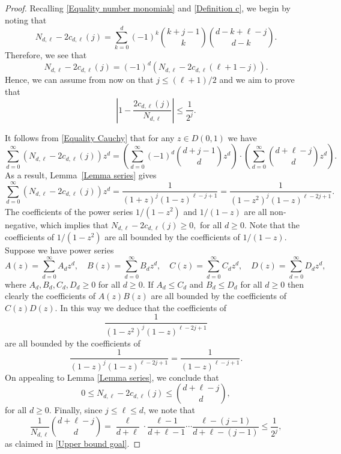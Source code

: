 \documentclass[11pt, reqno]{amsart}
\numberwithin{equation}{section}
\renewcommand{\leq}{\leqslant}
\renewcommand{\geq}{\geqslant}
\begin{document}
\begin{proof}
Recalling \eqref{Equality number monomials}
and \eqref{Definition c}, 
we begin by noting that
\begin{equation}
\label{Equality Cauchy}
N_{d,\ell} - 2 c_{d,\ell}(j) = \sum_{k=0}^d (-1)^k \binom{k+j-1}{k} \binom{d-k+\ell-j}{d-k}.
\end{equation}
Therefore, we see that
\begin{equation*}
N_{d,\ell} - 2 c_{d,\ell}(j) = (-1)^d \left( N_{d,\ell} - 2 c_{d,\ell}(\ell+1-j) \right).
\end{equation*}
Hence, we can assume from now on that $j \leq  (\ell+1)/2$ and we aim to prove that 
\begin{equation}
\label{Upper bound goal}
\left| 1-\frac{2c_{d,\ell}(j)}{N_{d,\ell}} \right| \leq 
 \frac{1}{2^j}.
\end{equation}

It follows from  \eqref{Equality Cauchy} that for any $z \in D(0,1)$ we have
\begin{equation*}
\sum_{d=0}^{\infty} \left( N_{d,\ell} - 2 c_{d,\ell}(j) \right) z^d = \left( \sum_{d=0}^{\infty} (-1)^d \binom{d+j-1}{d} z^d \right) \cdot \left( \sum_{d=0}^{\infty} \binom{d+\ell-j}{d} z^d \right).
\end{equation*}
As a result, Lemma~\ref{Lemma series} gives
\begin{equation*}
\sum_{d=0}^{\infty} \left( N_{d,\ell} - 2 c_{d,\ell}(j) \right) z^d = \frac1{(1+z)^j (1-z)^{\ell-j+1}}
= \frac1{(1-z^2)^j (1-z)^{\ell-2j+1}}.
\end{equation*}
The coefficients of the power series $1/(1-z^2)$ and $1/(1-z)$ are all non-negative, which implies that 
$
N_{d,\ell} - 2 c_{d,\ell}(j) \geq 0,
$ 
for all $d\geq 0$. Note that the coefficients of $1/(1-z^2)$ are all bounded by the coefficients of $1/(1-z)$.
Suppose we have power series
$$
A(z)=\sum_{d=0}^\infty A_d z^d, \quad 
B(z)=\sum_{d=0}^\infty B_d z^d, \quad
C(z)=\sum_{d=0}^\infty C_d z^d, \quad 
D(z)=\sum_{d=0}^\infty D_d z^d,
$$
where $A_d,B_d,C_d,D_d\geq 0$ for all $d\geq 0$.  If $A_d\leq C_d$ and $B_d\leq D_d$ for all $d\geq 0$ then clearly the coefficients of $A(z)B(z)$ are all bounded by the coefficients of $C(z)D(z)$. In this way we deduce that the coefficients of 
$$
 \frac1{(1-z^2)^j (1-z)^{\ell-2j+1}}
$$
are all bounded by the coefficients of 
$$
 \frac1{(1-z)^j (1-z)^{\ell-2j+1}}=
  \frac1{(1-z)^{\ell-j+1}}.
$$
On appealing to Lemma \ref{Lemma series}, we conclude  that 
$$
0\leq N_{d,\ell} - 2 c_{d,\ell}(j)\leq 
\binom{d+\ell-j}{d},
$$
for all $d\geq 0$.
Finally, since $j\leq \ell\leq d$, we note that 
$$
\frac{1}{N_{d,\ell}}\binom{d+\ell-j}{d}=\frac{\ell}{d+\ell}\cdot 
\frac{\ell-1}{d+\ell-1}\cdots 
\frac{\ell-(j-1)}{d+\ell-(j-1)}\leq \frac{1}{2^{j}},
$$
as claimed in 
\eqref{Upper bound goal}.
\end{proof}
\end{document}
